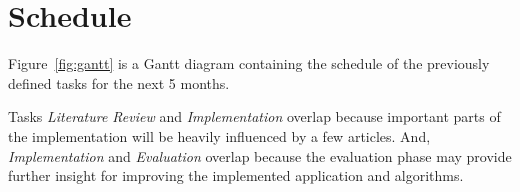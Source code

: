 \pagebreak

\section{Schedule} \label{sec:schedule}

Figure~\ref{fig:gantt} is a Gantt diagram containing the schedule
of the previously defined tasks for the next 5 months.

Tasks \emph{Literature Review} and \emph{Implementation} overlap
because important parts of the implementation will be heavily
influenced by a few articles. And, \emph{Implementation} and
\emph{Evaluation} overlap because the evaluation phase may provide
further insight for improving the implemented application and
algorithms.
